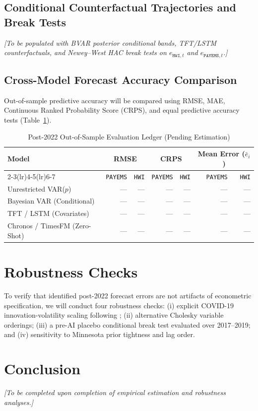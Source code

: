 \documentclass[11pt,a4paper]{article}
\begin{document}
\subsection{Conditional Counterfactual Trajectories and Break Tests}
\textit{[To be populated with BVAR posterior conditional bands, TFT/LSTM counterfactuals, and Newey--West HAC break tests on $e_{\texttt{HWI},t}$ and $e_{\texttt{PAYEMS},t}$.]}

\subsection{Cross-Model Forecast Accuracy Comparison}
Out-of-sample predictive accuracy will be compared using RMSE, MAE, Continuous Ranked Probability Score (CRPS), and \citet{diebold1995comparing} equal predictive accuracy tests (Table~\ref{tab:results_ledger}).

\begin{table}[htbp]
\centering
\caption{Post-2022 Out-of-Sample Evaluation Ledger (Pending Estimation)}
\label{tab:results_ledger}
\small
\begin{tabular}{@{}lrrrrrr@{}}
\toprule
Model & \multicolumn{2}{c}{RMSE} & \multicolumn{2}{c}{CRPS} & \multicolumn{2}{c}{Mean Error ($\bar{e}_i$)} \\
\cmidrule(lr){2-3}\cmidrule(lr){4-5}\cmidrule(lr){6-7}
 & \texttt{PAYEMS} & \texttt{HWI} & \texttt{PAYEMS} & \texttt{HWI} & \texttt{PAYEMS} & \texttt{HWI} \\
\midrule
Unrestricted VAR($p$) & --- & --- & --- & --- & --- & --- \\
Bayesian VAR (Conditional) & --- & --- & --- & --- & --- & --- \\
TFT / LSTM (Covariates) & --- & --- & --- & --- & --- & --- \\
Chronos / TimesFM (Zero-Shot) & --- & --- & --- & --- & --- & --- \\
\bottomrule
\end{tabular}
\end{table}

\section{Robustness Checks}
\label{sec:robustness}

To verify that identified post-2022 forecast errors are not artifacts of econometric specification, we will conduct four robustness checks: (i) explicit COVID-19 innovation-volatility scaling following \citet{lenza2022estimate}; (ii) alternative Cholesky variable orderings; (iii) a pre-AI placebo conditional break test evaluated over 2017--2019; and (iv) sensitivity to Minnesota prior tightness and lag order.

\section{Conclusion}
\label{sec:conclusion}

\textit{[To be completed upon completion of empirical estimation and robustness analyses.]}



\end{document}
